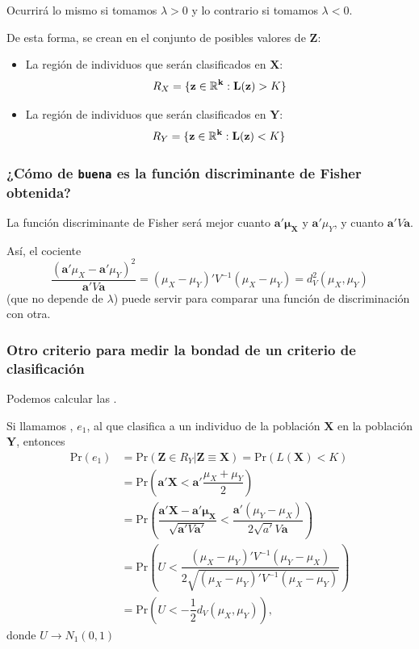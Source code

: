 Ocurrirá lo mismo si tomamos $\lambda>0$ y lo contrario si tomamos $\lambda<0$.

De esta forma, se crean  en el conjunto de posibles valores de $\mathbf{Z}$:
\begin{itemize}
	\item La región de individuos que serán clasificados en $\mathbf{X}$: 
	\[R_X=\{\mathbf{z\in\operatorname{\mathbb{R}}^k:L(\mathbf{z})}>K\}  \]
	\item La región de individuos que serán clasificados en $\mathbf{Y}$:
	\[R_Y=\{\mathbf{z\in\operatorname{\mathbb{R}}^k:L(\mathbf{z})}<K\}  \]
\end{itemize}
\subsubsection{¿Cómo de \textbf{\texttt{buena}} es la función discriminante de Fisher obtenida?}
La función discriminante de Fisher será mejor cuanto  $\mathbf{a'\mu_X}$ y $\mathbf{a'}\mu_Y$, y cuanto  $\mathbf{a'}V\mathbf{a}$.

Así, el cociente \[ \dfrac{(\mathbf{a'}\mu_X-\mathbf{a'}\mu_Y)^2}{\mathbf{a'}V\mathbf{a}}=(\mu_X-\mu_Y)'V^{-1}(\mu_X-\mu_Y)=d_V^2(\mu_X,\mu_Y) \](que no depende de $\lambda$) puede servir para comparar una función de discriminación con otra.

\subsubsection{Otro criterio para medir la bondad de un criterio de clasificación}
Podemos calcular las .

Si llamamos , $e_1$, al que clasifica a un individuo de la población $\mathbf{X}$ en la población $\mathbf{Y}$, entonces \begin{align*}
	\mathrm{Pr}(e_1)&=\mathrm{Pr}(\mathbf{Z}\in R_Y|\mathbf{Z\equiv X})=\mathrm{Pr}(L(\mathbf{X})<K)\\
	&=\mathrm{Pr}\left(\mathbf{a'X}<\mathbf{a'}\dfrac{\mu_X+\mu_Y}{2}\right)\\
	&=\mathrm{Pr}\left(\dfrac{\mathbf{a'X-a'\mu_X}}{\sqrt{\mathbf{a'}V\mathbf{a'}}}<\dfrac{\mathbf{a'}(\mu_Y-\mu_X)}{2\sqrt{a'}V\mathbf{a}}\right)\\
	&=\mathrm{Pr}\left(U<\dfrac{(\mu_X-\mu_Y)'V^{-1}(\mu_Y-\mu_X)}{2\sqrt{(\mu_X-\mu_Y)'V^{-1}(\mu_X-\mu_Y)}}\right)\\
	&=\mathrm{Pr}\left(U<-\dfrac{1}{2}d_V(\mu_X,\mu_Y)\right),
\end{align*}donde $U\longrightarrow N_1(0,1)$